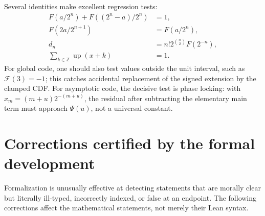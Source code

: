 \documentclass[11pt]{article}
\numberwithin{equation}{section}
\theoremstyle{definition}
\theoremstyle{remark}
\newcommand{\Z}{\mathbb Z}
\newcommand{\GF}{\mathcal F}
\newcommand{\upf}{\operatorname{up}}
\begin{document}
Several identities make excellent regression tests:
\begin{align}
 F(a/2^n)+F((2^n-a)/2^n)&=1,\label{eq:test-symmetry}\\
 F(2a/2^{n+1})&=F(a/2^n),\label{eq:test-refinement}\\
 d_n&=n!2^{\binom n2}F(2^{-n}),\label{eq:test-inverse}\\
 \sum_{k\in\Z}\upf(x+k)&=1.\label{eq:test-partition}
\end{align}
For global code, one should also test values outside the unit interval, such
as $\GF(3)=-1$; this catches accidental replacement of the signed extension
by the clamped CDF.  For asymptotic code, the decisive test is phase locking:
with $x_m=(m+u)2^{-(m+u)}$, the residual after subtracting the elementary main
term must approach $\Psi(u)$, not a universal constant.

\section{Corrections certified by the formal development}\label{sec:corrections}

Formalization is unusually effective at detecting statements that are
morally clear but literally ill-typed, incorrectly indexed, or false at an
endpoint.  The following corrections affect the mathematical statements, not
merely their Lean syntax.
\end{document}
